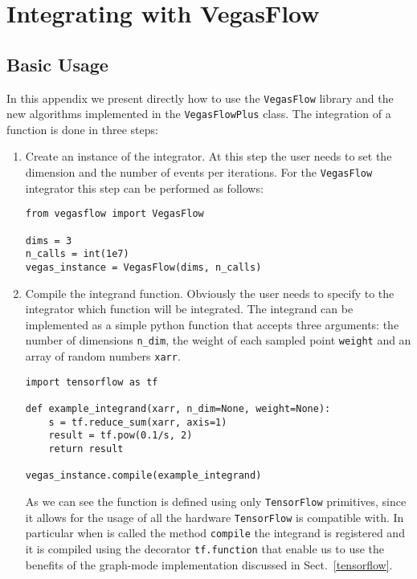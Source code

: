 \documentclass[../main/main.tex]{subfiles}
\begin{document}
\chapter{Integrating with VegasFlow}

\section{Basic Usage}
In this appendix we present directly how to use the \texttt{VegasFlow} library and the new algorithms implemented in the \texttt{VegasFlowPlus} class. The integration of a function is done in three steps:
\begin{enumerate}
	\item Create an instance of the integrator. At this step the user needs to set the dimension and the number of events per iterations. For the \texttt{VegasFlow} integrator this step can be performed as follows:
	\begin{verbatim}
from vegasflow import VegasFlow
		
dims = 3
n_calls = int(1e7)
vegas_instance = VegasFlow(dims, n_calls)
\end{verbatim}
\item Compile the integrand function. Obviously the user needs to specify to the integrator which function will be integrated. The integrand can be implemented as a simple python function that accepts three arguments: the number of dimensions \texttt{n\_dim}, the weight of each sampled point \texttt{weight} and an array of random numbers \texttt{xarr}.
\begin{verbatim}
import tensorflow as tf
	
def example_integrand(xarr, n_dim=None, weight=None):
	s = tf.reduce_sum(xarr, axis=1)
	result = tf.pow(0.1/s, 2)
	return result

vegas_instance.compile(example_integrand)
\end{verbatim}

As we can see the function is defined using only \texttt{TensorFlow} primitives, since it allows for the usage of all the hardware \texttt{TensorFlow} is compatible with. In particular when is called the method \texttt{compile} the integrand is registered and it is compiled using the decorator \texttt{tf.function} that enable us to use the benefits of the graph-mode implementation discussed in Sect.~\ref{tensorflow}.


\end{enumerate}
\end{document}
